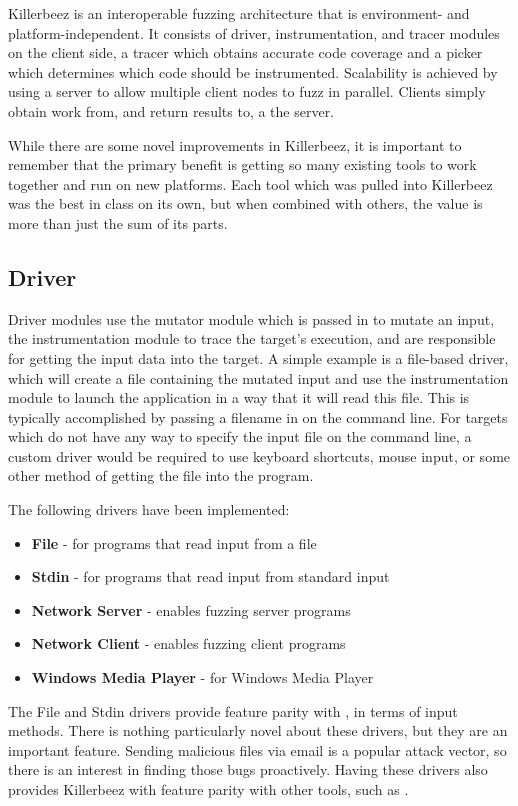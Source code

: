 Killerbeez is an interoperable fuzzing architecture that is
environment- and platform-independent. It consists of driver, instrumentation,
and tracer modules on the client side, a tracer which obtains accurate code
coverage and a picker which determines which code should be instrumented.
Scalability is achieved by using a \BOINC{} server to allow multiple client
nodes to fuzz in parallel.  Clients simply obtain work from, and return results
to, a the server.

While there are some novel improvements in Killerbeez, it is important to
remember that the primary benefit is getting so many existing tools to work
together and run on new platforms.  Each tool which was pulled into Killerbeez was the best in class on its own, but
when combined with others, the value is more than just the sum of its parts.

\subsection{Driver} \label{Driver}
Driver modules use the mutator module which is passed in to mutate an input,
the instrumentation module to trace the target's execution, and are responsible
for getting the input data into the target.  A simple example is a
file-based driver, which will create a file containing the mutated input and
use the instrumentation module to launch the application in a way that it will
read this file.  This is typically accomplished by passing a filename in on the
command line.  For targets which do not have any way to specify the input file
on the command line, a custom driver would be required to use keyboard
shortcuts, mouse input, or some other method of getting the file into the
program.

The following drivers have been implemented:
\begin{itemize}[noitemsep]
\item \textbf{File} - for programs that read input from a file
\item \textbf{Stdin} - for programs that read input from standard input
\item \textbf{Network Server} - enables fuzzing server programs
\item \textbf{Network Client} - enables fuzzing client programs
\item \textbf{Windows Media Player} - for Windows Media Player
\end{itemize}

The File and Stdin drivers provide feature parity with \AFL{}, in terms of input
methods. There is nothing particularly novel about these drivers, but they are
an important feature.  Sending malicious files via email is a popular attack
vector, so there is an interest in finding those bugs proactively. Having these
drivers also provides Killerbeez with feature parity with other tools, such as
\AFL{}.

